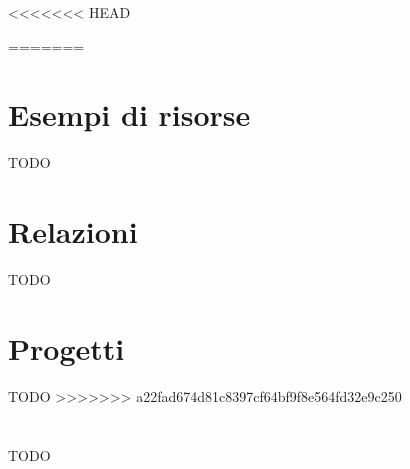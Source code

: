 \documentclass[12pt,a4paper,openright,twoside]{book}
\begin{document}


\tableofcontents   


<<<<<<< HEAD


=======

\chapter{Esempi di risorse}
\label{chap:esempi}
TODO
\chapter{Relazioni}
\label{chap:relazioni}
TODO
\chapter{Progetti}
\label{chap:progetti}
TODO
>>>>>>> a22fad674d81c8397cf64bf9f8e564fd32e9c250
\chapter{\conclusionsname}
\label{chap:conclusions}
TODO




\end{document}
